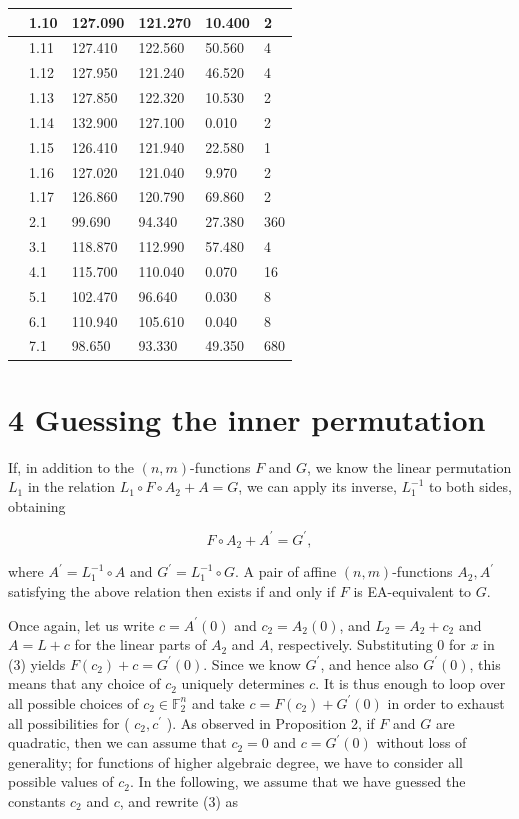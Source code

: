 \documentclass[10pt]{article}
\begin{document}
\begin{table}[h]
\begin{center}
\begin{tabular}{|l|l|l|l|l|l|}
\hline
 & 1.10 & 127.090 & 121.270 & 10.400 & 2 \\
\hline
 & 1.11 & 127.410 & 122.560 & 50.560 & 4 \\
\hline
 & 1.12 & 127.950 & 121.240 & 46.520 & 4 \\
\hline
 & 1.13 & 127.850 & 122.320 & 10.530 & 2 \\
\hline
 & 1.14 & 132.900 & 127.100 & 0.010 & 2 \\
\hline
 & 1.15 & 126.410 & 121.940 & 22.580 & 1 \\
\hline
 & 1.16 & 127.020 & 121.040 & 9.970 & 2 \\
\hline
 & 1.17 & 126.860 & 120.790 & 69.860 & 2 \\
\hline
 & 2.1 & 99.690 & 94.340 & 27.380 & 360 \\
\hline
 & 3.1 & 118.870 & 112.990 & 57.480 & 4 \\
\hline
 & 4.1 & 115.700 & 110.040 & 0.070 & 16 \\
\hline
 & 5.1 & 102.470 & 96.640 & 0.030 & 8 \\
\hline
 & 6.1 & 110.940 & 105.610 & 0.040 & 8 \\
\hline
 & 7.1 & 98.650 & 93.330 & 49.350 & 680 \\
\hline
\end{tabular}
\end{center}
\end{table}

\section*{4 Guessing the inner permutation}
If, in addition to the $(n, m)$-functions $F$ and $G$, we know the linear permutation $L_{1}$ in the relation $L_{1} \circ F \circ A_{2}+A=G$, we can apply its inverse, $L_{1}^{-1}$ to both sides, obtaining


\begin{equation*}
F \circ A_{2}+A^{\prime}=G^{\prime}, \tag{3}
\end{equation*}


where $A^{\prime}=L_{1}^{-1} \circ A$ and $G^{\prime}=L_{1}^{-1} \circ G$. A pair of affine $(n, m)$-functions $A_{2}, A^{\prime}$ satisfying the above relation then exists if and only if $F$ is EA-equivalent to $G$.

Once again, let us write $c=A^{\prime}(0)$ and $c_{2}=A_{2}(0)$, and $L_{2}=A_{2}+c_{2}$ and $A= L+c$ for the linear parts of $A_{2}$ and $A$, respectively. Substituting 0 for $x$ in (3) yields $F\left(c_{2}\right)+c=G^{\prime}(0)$. Since we know $G^{\prime}$, and hence also $G^{\prime}(0)$, this means that any choice of $c_{2}$ uniquely determines $c$. It is thus enough to loop over all possible choices of $c_{2} \in \mathbb{F}_{2}^{n}$ and take $c=F\left(c_{2}\right)+G^{\prime}(0)$ in order to exhaust all possibilities for ( $c_{2}, c^{\prime}$ ). As observed in Proposition 2, if $F$ and $G$ are quadratic, then we can assume that $c_{2}=0$ and $c=G^{\prime}(0)$ without loss of generality; for functions of higher algebraic degree, we have to consider all possible values of $c_{2}$. In the following, we assume that we have guessed the constants $c_{2}$ and $c$, and rewrite (3) as
\end{document}
